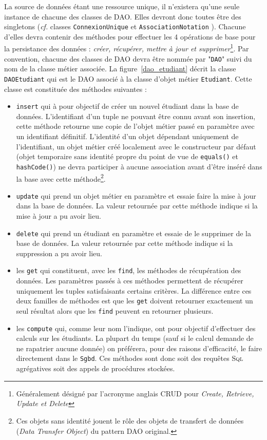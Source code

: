 \documentclass[a4paper,11pt]{article}
\begin{document}
La source de données étant une ressource unique, il n'existera qu'une seule instance de chacune 
des classes de DAO. Elles devront donc toutes être des singletons (\emph{cf.} classes 
\texttt{ConnexionUnique} et \texttt{AssociationNotation} ). Chacune d'elles devra contenir 
des méthodes pour effectuer les 4 opérations de base pour la persistance des données : 
\textit{créer, récupérer, mettre à jour et supprimer}\footnote{Généralement désigné par l'acronyme anglais CRUD pour 
\textit{Create, Retrieve, Update et Delete}}. Par convention, chacune des classes de DAO devra être 
nommée par "\texttt{DAO}" suivi du nom de la classe métier associée. La figure~\ref{dao_etudiant} 
décrit la classe \texttt{DAOEtudiant} qui est le DAO associé à la classe d'objet métier \texttt{Etudiant}.
Cette classe est constituée des méthodes suivantes :
\begin{itemize}
	\item \texttt{insert} qui à pour objectif de créer un nouvel étudiant dans la base de données.
	L'identifiant d'un tuple ne pouvant être connu avant son insertion, cette méthode retourne 
	une copie de l'objet métier passé en paramètre avec un identifiant définitif. L'identité d'un 
	objet dépendant uniquement de l'identifiant, un objet métier créé localement avec le 
	constructeur par défaut (objet temporaire sans identité propre du point de vue de 
	\texttt{equals()} et \texttt{hashCode()}) ne devra participer à aucune association 
	avant d'être inséré dans la base avec cette méthode\footnote{Ces objets sans identité jouent le rôle des objets 
	de transfert de données (\textit{Data Transfer Object}) du pattern DAO original.}.

	\item \texttt{update} qui prend un objet métier en paramètre et essaie faire la mise à jour 
	dans la base de données. La valeur retournée par cette méthode indique si la mise à jour 
	a pu avoir lieu.
	
  \item \texttt{delete} qui prend un étudiant en paramètre et essaie de le supprimer de la base 
  de données. La valeur retournée par cette méthode indique si la suppression a pu avoir lieu.
  
  \item les \texttt{get} qui constituent, avec les \texttt{find}, les méthodes 
  de récupération des données. Les paramètres passés à ces méthodes permettent de récupérer
  uniquement les tuples satisfaisants certains critères. La différence entre ces deux 
  familles de méthodes est que les \texttt{get} doivent retourner exactement un seul 
  résultat alors que les \texttt{find} peuvent en retourner plusieurs.
  
  \item les \texttt{compute} qui, comme leur nom l'indique, ont pour objectif d'effectuer des 
  calculs sur les étudiants. La plupart du temps (sauf si le calcul demande de ne rapatrier 
  aucune donnée) on préférera, pour des raisons d'efficacité, le faire directement dans le \texttt{Sgbd}. 
  Ces méthodes sont donc soit des requêtes \textsc{Sql} agrégatives soit des appels de procédures stockées.	
\end{itemize}
\end{document}
